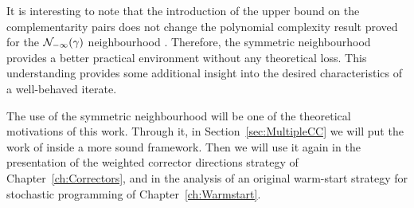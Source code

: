 It is interesting to note that the introduction of the upper bound 
on the complementarity pairs does not change the polynomial complexity 
result proved for the $\mathcal{N}_{-\infty}(\gamma)$ neighbourhood 
\cite[Theorem~5.12]{ipm:Wright97}. Therefore, the symmetric 
neighbourhood provides a better practical environment without any 
theoretical loss. This understanding provides some additional 
insight into the desired characteristics of a well-behaved iterate.

The use of the symmetric neighbourhood will be one of the theoretical
motivations of this work. Through it, in Section~\ref{sec:MultipleCC}
we will put the work of \cite{Gondzio96} inside a more sound framework.
Then we will use it again in the presentation of the weighted corrector
directions strategy of Chapter~\ref{ch:Correctors}, and in the analysis of an 
original warm-start strategy for stochastic programming of 
Chapter~\ref{ch:Warmstart}.
